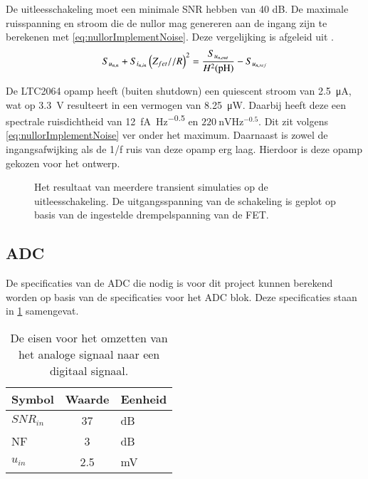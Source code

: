 De uitleesschakeling moet een minimale SNR hebben van 40 dB. De maximale ruisspanning en stroom die de nullor mag genereren aan de ingang zijn te berekenen met \cref{eq:nullorImplementNoise}. Deze vergelijking is afgeleid uit .
\begin{equation} \label{eq:nullorImplementNoise}
    S_{u_{{n,n}}} + S_{i_{{n,in}}}\left(Z_{fet} // R\right)^2 = \frac{S_{u_{{n,out}}}}{H^2(\mathrm{pH})} - S_{u_{{n,ref}}}
\end{equation}

De LTC2064 opamp heeft (buiten shutdown) een quiescent stroom van \qty{2.5}{\micro\ampere}, wat op \qty{3.3}{\volt} resulteert in een vermogen van \qty{8.25}{\micro\watt}. Daarbij heeft deze een spectrale ruisdichtheid van \qty{12}{\femto\ampere\hertz^{-0.5}} en $\qty{220}{\nano\volt\hertz^{-0.5}}$\cite{LTC2064}. Dit zit volgens \cref{eq:nullorImplementNoise} ver onder het maximum. Daarnaast is zowel de ingangsafwijking als de 1/f ruis van deze opamp erg laag. Hierdoor is deze opamp gekozen voor het ontwerp.


\begin{figure}[!htbp]
    \centering
    \pgfplotsset{width=0.7\textwidth}
    
    \caption{Het resultaat van meerdere transient simulaties op de uitleesschakeling. De uitgangsspanning van de schakeling is geplot op basis van de ingestelde drempelspanning van de FET.}
    \label{fig:readoutSimTrans}
\end{figure}

\subsection{ADC} \label{sec:selectingADCandReqs}
De specificaties van de ADC die nodig is voor dit project kunnen berekend worden op basis van de specificaties voor het ADC blok. Deze specificaties staan in \cref{tab:systemSpecADC} samengevat.
\begin{table}[!htbp]
    \centering
    \begin{tabular}{l|c|l}
        Symbol      & Waarde & Eenheid\\\hline
        $SNR_{in}$  & 37        & dB\\
        NF          & 3         & dB\\
        $u_{in}$    & 2.5       & mV\\
    \end{tabular}
    \caption{De eisen voor het omzetten van het analoge signaal naar een digitaal signaal.}
    \label{tab:systemSpecADC}
\end{table}

